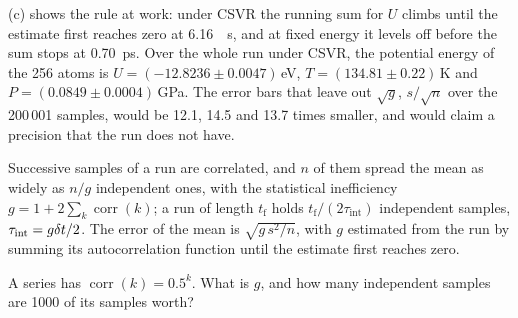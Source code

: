 (c) shows the rule at work: under CSVR the running sum
for $U$ climbs until the estimate first reaches zero at \SI{6.16}{\pico
\second}, and at fixed energy it levels off before the sum stops at
\SI{0.70}{\pico\second}. Over the whole run under CSVR, the potential
energy of the 256 atoms is $U = (-12.8236 \pm
0.0047)$\,\si{\electronvolt}, $T = (134.81 \pm 0.22)$\,\si{\kelvin} and $P =
(0.0849 \pm 0.0004)$\,\si{\giga\pascal}. The error bars that leave out
$\sqrt g$, $s/\sqrt n$ over the 200\,001 samples, would be 12.1, 14.5 and
13.7 times smaller, and would claim a precision that the run does not
have.

\begin{keyidea}
Successive samples of a run are correlated, and $n$ of them spread the
mean as widely as $n/g$ independent ones, with the statistical
inefficiency $g = 1 + 2\sum_k\operatorname{corr}(k)$; a run of length
$t_{\mathrm f}$ holds $t_{\mathrm f}/(2\tau_{\mathrm{int}})$ independent
samples, $\tau_{\mathrm{int}} = g\delta t/2$. The error of the mean is $\sqrt{g\,s^2/n}$, with $g$ estimated
from the run by summing its autocorrelation function until the estimate
first reaches zero.
\end{keyidea}


\begin{selfcheck}
A series has $\operatorname{corr}(k) = 0.5^k$. What is $g$, and how many
independent samples are 1000 of its samples worth?
\end{selfcheck}
